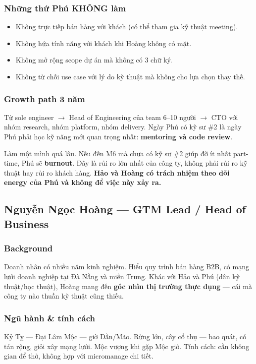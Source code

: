 \documentclass[11pt,a4paper]{article}
\begin{document}
\subsubsection*{Những thứ Phú KHÔNG làm}
\begin{itemize}
\item Không trực tiếp bán hàng với khách (có thể tham gia kỹ thuật meeting).
\item Không hứa tính năng với khách khi Hoàng không có mặt.
\item Không mở rộng scope dự án mà không có 3 chữ ký.
\item Không từ chối use case với lý do kỹ thuật mà không cho lựa chọn thay thế.
\end{itemize}

\subsubsection*{Growth path 3 năm}
Từ sole engineer $\to$ Head of Engineering của team 6--10 người $\to$ CTO với
nhóm research, nhóm platform, nhóm delivery. Ngày Phú có kỹ sư \#2 là ngày
Phú phải học kỹ năng mới quan trọng nhất: \textbf{mentoring và code review}.

\begin{warnbox}[title=Rủi ro lớn nhất của Phú]
Làm một mình quá lâu. Nếu đến M6 mà chưa có kỹ sư \#2 giúp đỡ ít nhất part-time,
Phú sẽ \textbf{burnout}. Đây là rủi ro lớn nhất của công ty, không phải rủi ro kỹ
thuật hay rủi ro khách hàng. \textbf{Hảo và Hoàng có trách nhiệm theo dõi energy
của Phú và không để việc này xảy ra.}
\end{warnbox}

\subsection{Nguyễn Ngọc Hoàng — GTM Lead / Head of Business}

\subsubsection*{Background}
Doanh nhân có nhiều năm kinh nghiệm. Hiểu quy trình bán hàng B2B, có mạng
lưới doanh nghiệp tại Đà Nẵng và miền Trung. Khác với Hảo và Phú
(dân kỹ thuật/học thuật), Hoàng mang đến \textbf{góc nhìn thị trường thực dụng}
--- cái mà công ty nào thuần kỹ thuật cũng thiếu.

\subsubsection*{Ngũ hành \& tính cách}
Kỷ Tỵ --- Đại Lâm Mộc --- giờ Dần/Mão. Rừng lớn, cây cổ thụ --- bao quát, có tán
rộng, giỏi xây mạng lưới. Mộc vượng khi gặp Mộc giờ. Tính cách: cần không gian
để thở, không hợp với micromanage chi tiết.
\end{document}
